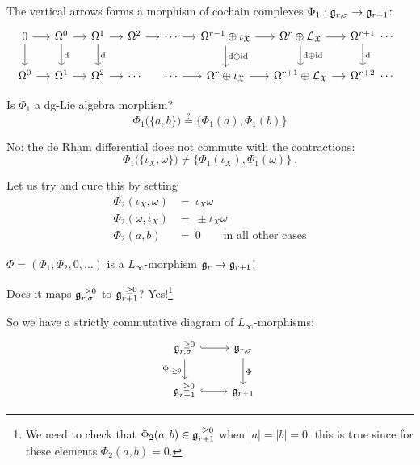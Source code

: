 \documentclass[beamer,10pt]{standalone}
\begin{document}
\begin{frame}
		The vertical arrows forms a morphism of cochain complexes $\Phi_1:\mathfrak{g}_{r,\sigma}\to \mathfrak{g}_{r+1}$:
	\begin{displaymath}
		\begin{tikzcd}[ampersand replacement=\&, column sep = small]
			0\ar[r]\ar[d] \&
			\Omega^0 \ar[r] \ar[d,"\d"] \&
			\Omega^1 \ar[r] \ar[d,"\d"] \&
			\Omega^2 \ar[r] \&
			\cdots \ar[r] \&
			\Omega^{r-1}\oplus \iota_{\X} \ar[d,"\d\oplus \id"] \ar[r] \&
			\Omega^{r}\oplus \Lie_{\X} \ar[r]\ar[d,"\d\oplus\id"] \&
			\Omega^{r+1} \ar[d,"\d"] \ar[r,phantom,"\cdots"] \& \phantom{.}
			\\
			\Omega^{0} \ar[r] \&
			\Omega^{1} \ar[r] \&
			\Omega^{2} \ar[r] \&
			\cdots \& \cdots \ar[r] \&
			\Omega^{r}\oplus\iota_{\X} \ar[r] \&
			\Omega^{r+1}\oplus \Lie_{\X} \ar[r] \&
			\Omega^{r+2} \ar[r,phantom,"\cdots"]  \& \phantom{.}
		\end{tikzcd}
	\end{displaymath}
	\vfill

	Is $\Phi_1$ a dg-Lie algebra morphism?
	$$ \Phi_1\big(\lbrace a, b \rbrace\big) \overset{?}{=} \big\lbrace \Phi_1(a), \Phi_1(b) \big\rbrace$$
	\vfill

	No: the de Rham differential does not commute with the contractions:
	$$ \Phi_1\big(\lbrace \iota_X, \omega \rbrace\big) \neq \big\lbrace \Phi_1(\iota_X), \Phi_1(\omega)\big\rbrace~.$$
\end{frame}

\begin{frame}
	Let us try and cure this by setting
	\begin{align*}
		\Phi_2(\iota_X,\omega) &=~ \iota_X \omega \\
		\Phi_2(\omega,\iota_X) &=~ \pm \iota_X \omega \\
		\Phi_2(a,b) &=~ 0 \qquad \text{in all other cases}
	\end{align*}
	\vfill

	$\Phi= (\Phi_1,\Phi_2,0,\dots)$ is a $L_\infty$-morphism $\mathfrak{g}_r \to \mathfrak{g}_{r+1}$!
	\vfill

	Does it maps $\mathfrak{g}_{r,\sigma}^{~\geq 0}$ to $\mathfrak{g}_{r+1}^{~\geq 0}$? Yes!\footnote{ We need to check that $\Phi_2(a,b)\in \mathfrak{g}_{r+1}^{~\geq 0}$ when $|a|=|b|=0$. this is true since for these elements $\Phi_2(a,b)=0$.}
	\vfill

	So we have a strictly commutative diagram of $L_\infty$-morphisms:
	\begin{displaymath}
		\begin{tikzcd}[ampersand replacement=\&]
			\g_{r,\sigma}^{~\geq 0} \ar[r,hook] \ar[d, "\Phi \vert_{\geq 0}"']
			\& \g_{r,\sigma} \ar[d, "\Phi"]
			\\
			\g_{r+1}^{~\geq 0} \ar[r,hook] \& \g_{r+1}
		\end{tikzcd}
	\end{displaymath}
\end{frame}
\end{document}
